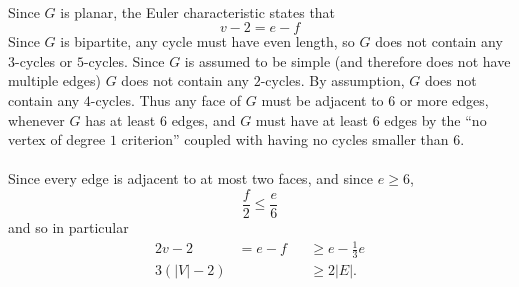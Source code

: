 \documentclass{article}
\newenvironment{solution}[1][Solution.]{\begin{trivlist}
\item[\hskip \labelsep {\bfseries #1}]}{\end{trivlist}}
\begin{document}
\begin{solution} \text{} \\
  Since $G$ is planar, the Euler characteristic states that \[
    v - 2 = e - f
  \]
  Since $G$ is bipartite, any cycle must have even length, so $G$ does not
  contain any $3$-cycles or $5$-cycles. Since $G$ is
  assumed to be simple (and therefore does not have multiple edges) $G$ does
  not contain any $2$-cycles. By assumption, $G$ does not contain any $4$-cycles.
  Thus any face of $G$ must be adjacent to $6$ or more edges, whenever $G$ has
  at least $6$ edges, and $G$ must have at least $6$ edges by the ``no vertex of
  degree $1$ criterion'' coupled with having no cycles smaller than $6$.
  \\~\\
  Since every edge is adjacent to at most two faces, and since $e \geq 6$, \[
    \frac f2 \leq \frac e6
  \] and so in particular \begin{alignat*}{2}
    v - 2 &= e - f &&\geq e - \frac 13e \\
    3(|V| - 2)& &&\geq 2|E|.
  \end{alignat*}
\end{solution}
\end{document}
